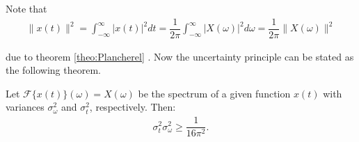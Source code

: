 Note that
\begin{align*}
\|x(t)\|^2 = \int_{-\infty}^\infty |x(t)|^2 dt = \dfrac{1}{2\pi} \int_{-\infty}^\infty |X(\omega)|^2 d\omega = \dfrac{1}{2\pi} \|X(\omega)\|^2
\end{align*}

due to theorem \ref{theo:Plancherel} . Now the uncertainty principle can be stated as the following theorem.

\begin{theorem}
Let $\mathcal{F}\{x(t)\}(\omega) = X(\omega)$ be the spectrum of a given function $x(t)$ with variances $\sigma_\omega^2$ and $\sigma_t^2$, respectively. Then:
\begin{align*}
\sigma_t^2 \sigma_\omega^2 \geq \dfrac{1}{16 \pi^2}.
\end{align*}
\end{theorem}

